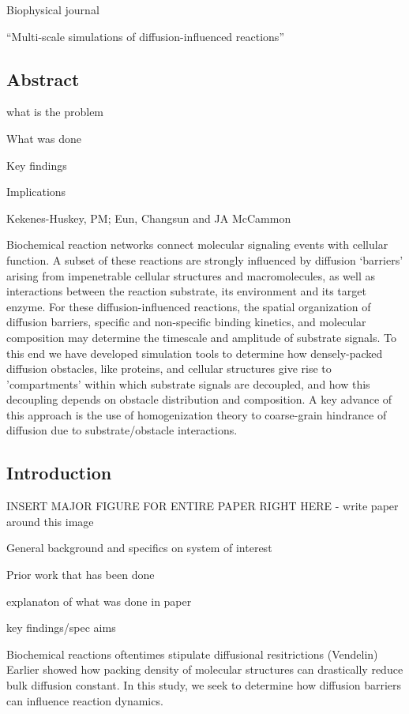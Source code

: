 Biophysical journal 


 “Multi-scale simulations of diffusion-influenced reactions”

\subsection{Abstract}
\lbi
\item what is the problem 
\item What was done
\item Key findings
\item Implications 
\lei

Kekenes-Huskey, PM; Eun, Changsun and JA McCammon

Biochemical reaction networks connect molecular signaling events with cellular function. 
A subset of these reactions are strongly influenced by diffusion ‘barriers’ arising from impenetrable cellular structures and macromolecules, as well as interactions between the reaction substrate, its environment and its target enzyme.
For these diffusion-influenced reactions, the spatial organization of diffusion barriers, specific and non-specific binding kinetics, and molecular composition may determine the timescale and amplitude of substrate signals. 
To this end we have developed simulation tools to determine how densely-packed diffusion obstacles, like proteins, and cellular structures give rise to  ’compartments’ within which substrate signals are decoupled, and how this decoupling depends on obstacle distribution and composition.
A key advance of this approach is the use of homogenization theory to coarse-grain hindrance of diffusion due to substrate/obstacle interactions.




\subsection{Introduction}
\lbi
\item INSERT MAJOR FIGURE FOR ENTIRE PAPER RIGHT HERE - write paper around this image 
\item General background and specifics on system of interest
\item Prior work that has been done
\item explanaton of what was done in paper 
\item key findings/spec aims
\lei

Biochemical reactions oftentimes stipulate diffusional resitrictions (Vendelin) 
Earlier showed how packing density of molecular structures can drastically reduce bulk diffusion constant. 
In this study, we seek to determine how diffusion barriers can influence reaction dynamics.



